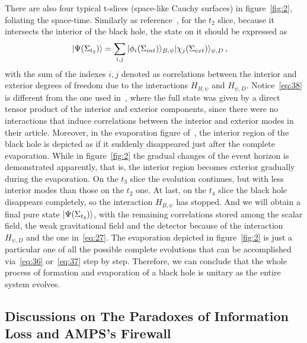\documentclass[12pt,a4paper]{article}
\begin{document}
There are also four typical t-slices (space-like Cauchy
surfaces) in figure~\ref{fig:2}, foliating the space-time. Similarly
as reference~\cite{c}, for the $t_2$ slice, because it
intersects the interior of the black hole, the state on it should be
expressed as
\begin{equation}
\label{eq:38}
\begin{split}
\arrowvert\Psi(\Sigma_{t_2})\rangle &= \sum_{i,j}\arrowvert
\phi_i(\Sigma_{int})\rangle_{B,\psi}\arrowvert\chi_j(\Sigma_{ext})\rangle_{\psi,D}
\,,
\end{split}
\end{equation}
with the sum of the indexes $i,j$ denoted as correlations between the interior and exterior degrees of freedom due to the interactions $H_{B,\psi}$ and $H_{\psi,D}$. Notice~\eqref{eq:38} is different from the one used in~\cite{c}, where the full state was given by a direct tensor product of the interior and exterior components, since there were no interactions that induce correlations between the interior and exterior modes in their article. Moreover, in the evaporation figure of~\cite{c}, the interior region of the black hole is depicted as if it suddenly disappeared just after the complete evaporation. While in figure~\ref{fig:2} the gradual changes of the event horizon is demonstrated apparently, that is, the interior region becomes exterior gradually during the evaporation. On the $t_3$ slice the evolution continues, but with less interior modes than those on the $t_2$ one. At last, on the $t_4$ slice the black hole disappears completely, so the interaction $H_{B,\psi}$ has stopped. And we will obtain a final pure state
$\arrowvert\Psi(\Sigma_{t_4})\rangle$, with the remaining
correlations stored among the scalar field, the weak gravitational field and the detector because of the
interaction $H_{\psi,D}$ and the one in~\eqref{eq:27}. The evaporation depicted in figure~\ref{fig:2} is just a particular one of all the possible complete
evolutions that can be accomplished via~\eqref{eq:36} or~\eqref{eq:37} step by step.
Therefore, we can conclude that the whole process of formation and evaporation of a black hole is
unitary as the entire system evolves.

\subsection{Discussions on The Paradoxes of Information Loss and AMPS's Firewall }
\label{sec:infor}
\end{document}

